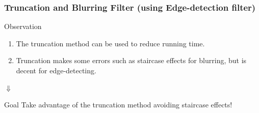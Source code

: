 \documentclass{beamer}
\begin{document}
\begin{frame}
\end{frame}

\begin{frame}
\frametitle{Truncation and Blurring Filter (using Edge-detection filter)}
Observation
\begin{enumerate}
\item The truncation method can be used to reduce running time.
\item Truncation makes some errors such as staircase effects for blurring, but is decent for edge-detecting.
\end{enumerate}
\bigskip
\pause
\begin{center}
$\Downarrow$
\end{center}

\pause
\begin{beamerboxesrounded}[lower=eeks2,upper=eecks,
shadow=true]{Goal}
Take advantage of the truncation method avoiding staircase effects!
\end{beamerboxesrounded}
\end{frame}
\end{document}
